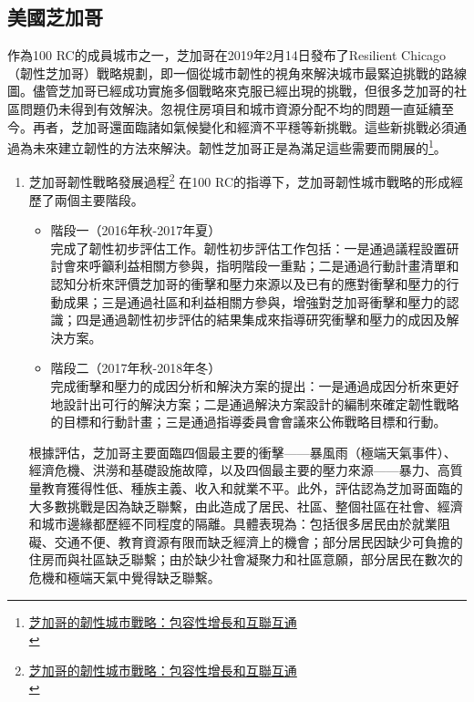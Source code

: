 \documentclass[a4paper,12pt]{article}
\begin{document}
\subsection{美國芝加哥}
\label{sec:org696043a}
作為100 RC的成員城市之一，芝加哥在2019年2月14日發布了Resilient Chicago（韌性芝加哥）戰略規劃，即一個從城市韌性的視角來解決城市最緊迫挑戰的路線圖。儘管芝加哥已經成功實施多個戰略來克服已經出現的挑戰，但很多芝加哥的社區問題仍未得到有效解決。忽視住房項目和城市資源分配不均的問題一直延續至今。再者，芝加哥還面臨諸如氣候變化和經濟不平穩等新挑戰。這些新挑戰必須通過為未來建立韌性的方法來解決。韌性芝加哥正是為滿足這些需要而開展的\footnote{\href{https://kknews.cc/zh-tw/news/pvvn99e.html}{芝加哥的韌性城市戰略：包容性增長和互聯互通}\\}。\\

\begin{enumerate}
\item 芝加哥韌性戰略發展過程\footnote{\href{https://mp.weixin.qq.com/s?\_\_biz=MzU2MzAwODQ4Nw==\&mid=2247489943\&idx=1\&sn=a1987dbeae81fb25d008b398ec8a205d\&chksm=fc619f1fcb161609ce22efb7b7bd8e9ae6d1e0e51dcb5b7fc9c7700d6c117f7467b2c4ebf215\&scene=27\#wechat\_redirect}{芝加哥的韌性城市戰略：包容性增長和互聯互通}\\}
\label{sec:org9dc85fa}
在100 RC的指導下，芝加哥韌性城市戰略的形成經歷了兩個主要階段。\\
\begin{itemize}
\item 階段一（2016年秋-2017年夏）\\
完成了韌性初步評估工作。韌性初步評估工作包括：一是通過議程設置研討會來呼籲利益相關方參與，指明階段一重點；二是通過行動計畫清單和認知分析來評價芝加哥的衝擊和壓力來源以及已有的應對衝擊和壓力的行動成果；三是通過社區和利益相關方參與，增強對芝加哥衝擊和壓力的認識；四是通過韌性初步評估的結果集成來指導研究衝擊和壓力的成因及解決方案。\\
\item 階段二（2017年秋-2018年冬）\\
完成衝擊和壓力的成因分析和解決方案的提出：一是通過成因分析來更好地設計出可行的解決方案；二是通過解決方案設計的編制來確定韌性戰略的目標和行動計畫；三是通過指導委員會會議來公佈戰略目標和行動。\\
\end{itemize}

根據評估，芝加哥主要面臨四個最主要的衝擊——暴風雨（極端天氣事件）、經濟危機、洪澇和基礎設施故障，以及四個最主要的壓力來源——暴力、高質量教育獲得性低、種族主義、收入和就業不平。此外，評估認為芝加哥面臨的大多數挑戰是因為缺乏聯繫，由此造成了居民、社區、整個社區在社會、經濟和城市邊緣都歷經不同程度的隔離。具體表現為：包括很多居民由於就業阻礙、交通不便、教育資源有限而缺乏經濟上的機會；部分居民因缺少可負擔的住房而與社區缺乏聯繫；由於缺少社會凝聚力和社區意願，部分居民在數次的危機和極端天氣中覺得缺乏聯繫。\\


\end{enumerate}
\end{document}
